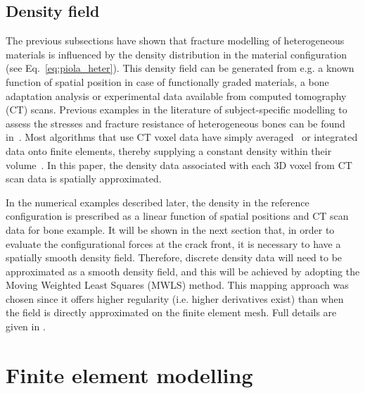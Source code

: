 \documentclass[onecolumn]{svjour3}
\begin{document}
\subsection{Density field}
\label{sec:dens_mapping}
The previous subsections have shown that  fracture modelling of heterogeneous materials is influenced by the density distribution in the material configuration (see Eq.~\ref{eq:piola_heter}). This density field can be generated from e.g.  a known function of spatial position in case of functionally graded materials, a bone adaptation analysis \cite{kuhl2003theory} or experimental data available from computed tomography (CT) scans. Previous examples in the literature of subject-specific modelling to assess the stresses and fracture resistance of heterogeneous bones can be found in~\cite{poelert2013patient,Helgason2008b,yosibash2010predicting}. Most algorithms that use CT voxel data have simply averaged~\cite{zannoni1999material} or integrated data onto finite elements, thereby supplying a constant density within their volume~\cite{taddei2007material, schileo2008subject}. In this paper, the density data associated with each 3D voxel from CT scan data is spatially approximated. 

In the numerical examples described later, the density in the reference configuration is prescribed as a linear function of spatial positions and CT scan data for bone example. It will be shown in the next section that, in order to evaluate the configurational forces at the crack front, it is necessary to have a spatially smooth density field. Therefore, discrete density data will need to be approximated as a smooth density field, and this will be achieved by adopting the Moving Weighted Least Squares (MWLS) method. This mapping approach was chosen since it offers higher regularity (i.e. higher derivatives exist) than when the field is
directly approximated on the finite element mesh. Full details are given in \cite{karol_lewandowski_moving_2019}.  %
% 
\section{Finite element modelling} \label{sec:fem_modelling}
% 
\end{document}
